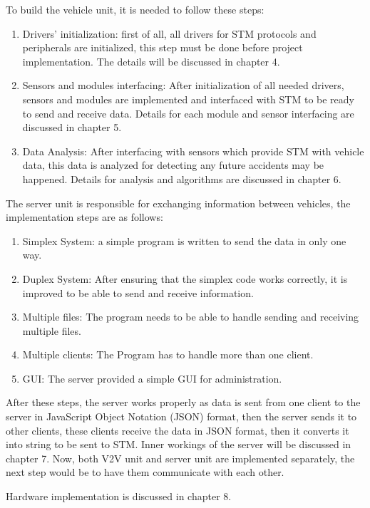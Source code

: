  To build the vehicle unit, it is needed to follow these steps:
 \begin{enumerate}
     \item Drivers’ initialization: first of all, all drivers for STM protocols and peripherals are initialized, this step must be done before project implementation. The details will be discussed in chapter 4.
     \item Sensors and modules interfacing: After initialization of all needed drivers, sensors and modules are implemented and interfaced with STM to be ready to send and receive data. Details for each module and sensor interfacing are discussed in chapter 5.
     \item Data Analysis: After interfacing with sensors which provide STM with vehicle data, this data is analyzed for detecting any future accidents may be happened. Details for analysis and algorithms are discussed in chapter 6.
 \end{enumerate}
 
 
 The server unit is responsible for exchanging information between vehicles, the implementation steps are as follows:
 
 \begin{enumerate}
     \item Simplex System: a simple program is written to send the data in only one way.
     \item Duplex System: After ensuring that the simplex code works correctly, it is improved to be able to send and receive information.
     \item Multiple files: The program needs to be able to handle sending and receiving multiple files.
     \item Multiple clients: The Program has to handle more than one client.
     \item GUI: The server provided a simple GUI for administration.
\end{enumerate}
 After these steps, the server works properly as data is sent from one client to the server in JavaScript Object Notation (JSON) format, then the server sends it to other clients, these clients receive the data in JSON format, then it converts it into string to be sent to STM. Inner workings of the server will be discussed in chapter 7. \newline
 Now, both V2V unit and server unit are implemented separately, the next step would be to have them communicate with each other.
 
 Hardware implementation is discussed in chapter 8.
 
 